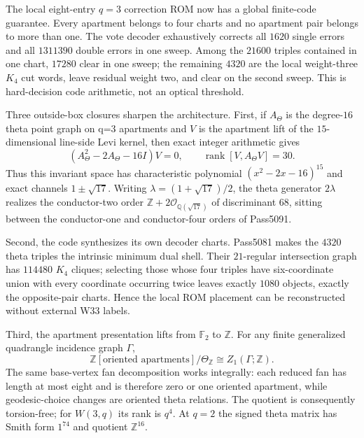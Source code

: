The local eight-entry $q=3$ correction ROM now has a global finite-code guarantee.  Every apartment belongs to four charts and no apartment pair belongs to more than one.  The vote decoder exhaustively corrects all $1620$ single errors and all $1311390$ double errors in one sweep.  Among the $21600$ triples contained in one chart, $17280$ clear in one sweep; the remaining $4320$ are the local weight-three $K_4$ cut words, leave residual weight two, and clear on the second sweep.  This is hard-decision code arithmetic, not an optical threshold.

Three outside-box closures sharpen the architecture.  First, if $A_\Theta$ is the degree-$16$ theta point graph on q=3 apartments and $V$ is the apartment lift of the $15$-dimensional line-side Levi kernel, then exact integer arithmetic gives
\[
 (A_\Theta^2-2A_\Theta-16I)V=0,\qquad \operatorname{rank}[V,A_\Theta V]=30.
\]
Thus this invariant space has characteristic polynomial $(x^2-2x-16)^{15}$ and exact channels $1\pm\sqrt{17}$.  Writing $\lambda=(1+\sqrt{17})/2$, the theta generator $2\lambda$ realizes the conductor-two order $\mathbb Z+2\mathcal O_{\mathbb Q(\sqrt{17})}$ of discriminant $68$, sitting between the conductor-one and conductor-four orders of Pass5091.

Second, the code synthesizes its own decoder charts.  Pass5081 makes the $4320$ theta triples the intrinsic minimum dual shell.  Their $21$-regular intersection graph has $114480$ $K_4$ cliques; selecting those whose four triples have six-coordinate union with every coordinate occurring twice leaves exactly $1080$ objects, exactly the opposite-pair charts.  Hence the local ROM placement can be reconstructed without external W33 labels.

Third, the apartment presentation lifts from $\mathbb F_2$ to $\mathbb Z$.  For any finite generalized quadrangle incidence graph $\Gamma$,
\[
 \boxed{\mathbb Z[\text{oriented apartments}]/\Theta_{\mathbb Z}\cong Z_1(\Gamma;\mathbb Z).}
\]
The same base-vertex fan decomposition works integrally: each reduced fan has length at most eight and is therefore zero or one oriented apartment, while geodesic-choice changes are oriented theta relations.  The quotient is consequently torsion-free; for $W(3,q)$ its rank is $q^4$.  At $q=2$ the signed theta matrix has Smith form $1^{74}$ and quotient $\mathbb Z^{16}$.
\fi
